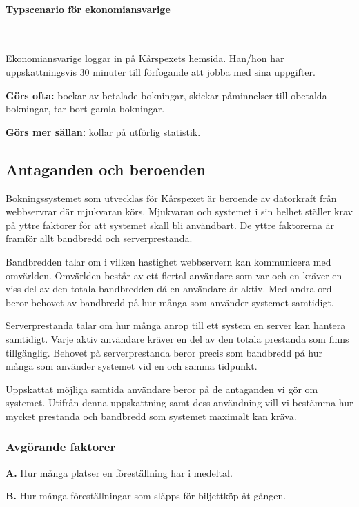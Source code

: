 \documentclass[a4paper, twoside, 11pt, titlepage]{article}
\begin{document}
			\paragraph{Typscenario för ekonomiansvarige}\

			Ekonomiansvarige loggar in på Kårspexets hemsida. Han/hon har uppskattningsvis 30 minuter till förfogande att jobba med sina uppgifter.

			\textbf{Görs ofta:} bockar av betalade bokningar, skickar påminnelser till obetalda bokningar, tar bort gamla bokningar.

			\textbf{Görs mer sällan:} kollar på utförlig statistik.

	\subsection{Antaganden och beroenden}


	Bokningssystemet som utvecklas för Kårspexet är beroende av datorkraft från webbservrar där mjukvaran körs. Mjukvaran och systemet i sin helhet ställer krav på yttre faktorer för att systemet skall bli användbart. De yttre faktorerna är framför allt bandbredd och serverprestanda.

	Bandbredden talar om i vilken hastighet webbservern kan kommunicera med omvärlden. Omvärlden består av ett flertal användare som var och en kräver en viss del av den totala bandbredden då en användare är aktiv. Med andra ord beror behovet av bandbredd på hur många som använder systemet samtidigt.

	Serverprestanda talar om hur många anrop till ett system en server kan hantera samtidigt. Varje aktiv användare kräver en del av den totala prestanda som finns tillgänglig. Behovet på serverprestanda beror precis som bandbredd på hur många som använder systemet vid en och samma tidpunkt.

	Uppskattat möjliga samtida användare beror på de antaganden vi gör om systemet. Utifrån denna uppskattning samt dess användning vill vi bestämma hur mycket prestanda och bandbredd som systemet maximalt kan kräva.

		\subsubsection{Avgörande faktorer}


		\textbf{A.} Hur många platser en föreställning har i medeltal.

		\textbf{B.} Hur många föreställningar som släpps för biljettköp åt gången.
\end{document}
